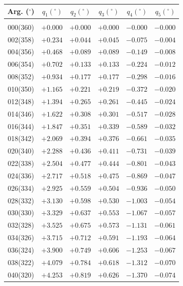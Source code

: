 \clearpage
\begin{table}[!h]\centering
\vspace{0.25cm}
 \begin{tabular}{crrrrr}
Arg. ($^\circ$) & $q_1(^\circ)$  & $q_2(^\circ)$ & $q_3(^\circ)$ & $q_4(^\circ)$  & $q_5(^\circ)$  \\\hline
&&&&&\\[-1.75ex]
000(360) & $+0.000$ & $+0.000$ & $+0.000$ & $-0.000$ & $-0.000$ \\
002(358) & $+0.234$ & $+0.044$ & $+0.045$ & $-0.075$ & $-0.004$ \\ 
004(356) & $+0.468$ & $+0.089$ & $+0.089$ & $-0.149$ & $-0.008$ \\ 
006(354) & $+0.702$ & $+0.133$ & $+0.133$ & $-0.224$ & $-0.012$ \\
008(352) & $+0.934$ & $+0.177$ & $+0.177$ & $-0.298$ & $-0.016$ \\ 
010(350) & $+1.165$ & $+0.221$ & $+0.219$ & $-0.372$ & $-0.020$ \\ 
012(348) & $+1.394$ & $+0.265$ & $+0.261$ & $-0.445$ & $-0.024$ \\
014(346) & $+1.622$ & $+0.308$ & $+0.301$ & $-0.517$ & $-0.028$ \\ 
016(344) & $+1.847$ & $+0.351$ & $+0.339$ & $-0.589$ & $-0.032$ \\ 
018(342) & $+2.069$ & $+0.394$ & $+0.376$ & $-0.661$ & $-0.035$ \\ 
020(340) & $+2.288$ & $+0.436$ & $+0.411$ & $-0.731$ & $-0.039$ \\ 
022(338) & $+2.504$ & $+0.477$ & $+0.444$ & $-0.801$ & $-0.043$ \\ 
024(336) & $+2.717$ & $+0.518$ & $+0.475$ & $-0.869$ & $-0.047$ \\ 
026(334) & $+2.925$ & $+0.559$ & $+0.504$ & $-0.936$ & $-0.050$ \\ 
028(332) & $+3.130$ & $+0.598$ & $+0.530$ & $-1.003$ & $-0.054$ \\ 
030(330) & $+3.329$ & $+0.637$ & $+0.553$ & $-1.067$ & $-0.057$ \\ 
032(328) & $+3.525$ & $+0.675$ & $+0.573$ & $-1.131$ & $-0.061$ \\ 
034(326) & $+3.715$ & $+0.712$ & $+0.591$ & $-1.193$ & $-0.064$ \\ 
036(324) & $+3.900$ & $+0.749$ & $+0.606$ & $-1.253$ & $-0.067$ \\ 
038(322) & $+4.079$ & $+0.784$ & $+0.618$ & $-1.312$ & $-0.070$ \\ 
040(320) & $+4.253$ & $+0.819$ & $+0.626$ & $-1.370$ & $-0.074$ \\ 

\end{tabular}
\end{table}
